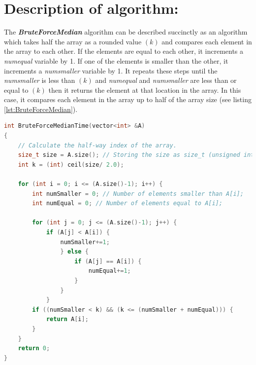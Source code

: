 \documentclass[12pt]{article}
\begin{document}
\newpage 
	
\section{Description of algorithm:}
The \textit{\textbf{BruteForceMedian}} algorithm can be described succinctly as an algorithm which takes half the array as a rounded value $(k)$ and compares each element in the array to each other. If the elements are equal to each other, it increments a \textit{numequal} variable by 1. If one of the elements is smaller than the other, it increments a \textit{numsmaller} variable by 1. It repeats these steps until the \textit{numsmaller} is less than $(k)$ and \textit{numequal} and \textit{numsmaller }are less than or equal to $(k)$ then it returns the element at that location in the array. In this case, it compares each element in the array up to half of the array size (see listing \ref{lst:BruteForceMedian}).

\begin{lstlisting}[caption={BruteForceMedian algorithm implementation (timing implementation)},label={lst:BruteForceMedian},language=C++]
int BruteForceMedianTime(vector<int> &A)
{
	// Calculate the half-way index of the array.
	size_t size = A.size(); // Storing the size as size_t (unsigned int)
	int k = (int) ceil(size/ 2.0);
	
	for (int i = 0; i <= (A.size()-1); i++) {
		int numSmaller = 0; // Number of elements smaller than A[i];
		int numEqual = 0; // Number of elements equal to A[i];
		
		for (int j = 0; j <= (A.size()-1); j++) {
			if (A[j] < A[i]) {
				numSmaller+=1;
				} else {
					if (A[j] == A[i]) {
						numEqual+=1;
					}
				}
			}
		if ((numSmaller < k) && (k <= (numSmaller + numEqual))) {
			return A[i];
		}
	}
	return 0;
}
\end{lstlisting}
\end{document}
